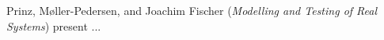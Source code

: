 

Prinz, M{\o}ller-Pedersen, and Joachim Fischer
\cite{isola-2016-prinz}
({\em Modelling and Testing of Real Systems})
present ...

